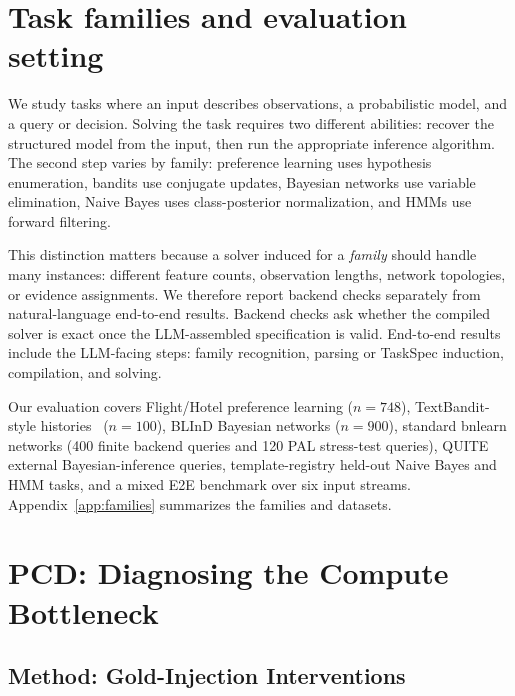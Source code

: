\documentclass{article}
\newcommand{\taskspec}{TaskSpec}
\begin{document}
\section{Task families and evaluation setting}
\label{sec:background}

We study tasks where an input describes observations, a probabilistic model, and a query or decision.
Solving the task requires two different abilities: recover the structured model from the input, then run the appropriate inference algorithm.
The second step varies by family: preference learning uses hypothesis enumeration, bandits use conjugate updates, Bayesian networks use variable elimination, Naive Bayes uses class-posterior normalization, and HMMs use forward filtering.

This distinction matters because a solver induced for a \emph{family} should handle many instances: different feature counts, observation lengths, network topologies, or evidence assignments.
We therefore report backend checks separately from natural-language end-to-end results.
Backend checks ask whether the compiled solver is exact once the LLM-assembled specification is valid.
End-to-end results include the LLM-facing steps: family recognition, parsing or \taskspec{} induction, compilation, and solving.

Our evaluation covers Flight/Hotel preference learning ($n{=}748$), TextBandit-style histories~\citep{lim2025textbandit} ($n{=}100$), BLInD Bayesian networks ($n{=}900$), standard bnlearn networks (400 finite backend queries and 120 PAL stress-test queries), QUITE external Bayesian-inference queries, template-registry held-out Naive Bayes and HMM tasks, and a mixed E2E benchmark over six input streams.
Appendix~\ref{app:families} summarizes the families and datasets.

\section{PCD: Diagnosing the Compute Bottleneck}
\label{sec:pcd}

\subsection{Method: Gold-Injection Interventions}
\end{document}
